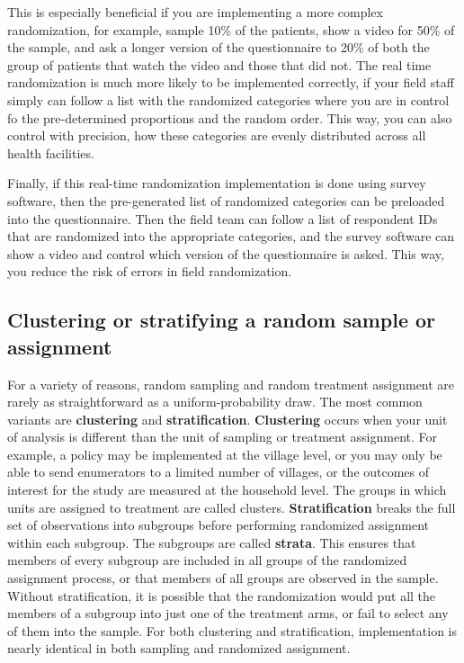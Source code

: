 This is especially beneficial if you are implementing a more complex randomization,
for example, sample 10\% of the patients, show a video for 50\% of the sample,
and ask a longer version of the questionnaire to 20\% of both
the group of patients that watch the video and those that did not.
The real time randomization is much more likely to be implemented correctly,
if your field staff simply can follow a list with the randomized categories
where you are in control fo the pre-determined proportions and the random order.
This way, you can also control with precision,
how these categories are evenly distributed across all health facilities.

Finally, if this real-time randomization implementation is done using survey software,
then the pre-generated list of randomized categories can be preloaded
into the questionnaire.
Then the field team can follow a list of respondent IDs
that are randomized into the appropriate categories,
and the survey software can show a video and control which version of the questionnaire is asked.
This way, you reduce the risk of errors in field randomization.



\subsection{Clustering or stratifying a random sample or assignment}

For a variety of reasons, random sampling and random treatment assignment
are rarely as straightforward as a uniform-probability draw.
The most common variants are \textbf{clustering} and \textbf{stratification}.\cite{athey2017econometrics}
\textbf{Clustering} occurs when your unit of analysis is different
than the unit of sampling or treatment assignment.
For example, a policy may be implemented at the village level,
or you may only be able to send enumerators to a limited number of villages,
or the outcomes of interest for the study are measured at the household level.
The groups in which units are assigned to treatment are called clusters.
\textbf{Stratification} breaks the full set of observations into subgroups
before performing randomized assignment within each subgroup.
The subgroups are called \textbf{strata}.
This ensures that members of every subgroup
are included in all groups of the randomized assignment process,
or that members of all groups are observed in the sample.
Without stratification, it is possible that the randomization
would put all the members of a subgroup into just one of the treatment arms,
or fail to select any of them into the sample.
For both clustering and stratification,
implementation is nearly identical in both sampling and randomized assignment.

